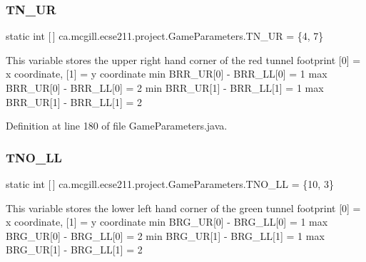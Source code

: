 \subsubsection{\texorpdfstring{T\+N\+\_\+\+UR}{TN\_UR}}
{\footnotesize\ttfamily  static  int \mbox{[}$\,$\mbox{]} ca.\+mcgill.\+ecse211.\+project.\+Game\+Parameters.\+T\+N\+\_\+\+UR = \{4, 7\}\hspace{0.3cm}{\ttfamily [static]}}

This variable stores the upper right hand corner of the red tunnel footprint \mbox{[}0\mbox{]} = x coordinate, \mbox{[}1\mbox{]} = y coordinate min B\+R\+R\+\_\+\+UR\mbox{[}0\mbox{]} -\/ B\+R\+R\+\_\+\+LL\mbox{[}0\mbox{]} = 1 max B\+R\+R\+\_\+\+UR\mbox{[}0\mbox{]} -\/ B\+R\+R\+\_\+\+LL\mbox{[}0\mbox{]} = 2 min B\+R\+R\+\_\+\+UR\mbox{[}1\mbox{]} -\/ B\+R\+R\+\_\+\+LL\mbox{[}1\mbox{]} = 1 max B\+R\+R\+\_\+\+UR\mbox{[}1\mbox{]} -\/ B\+R\+R\+\_\+\+LL\mbox{[}1\mbox{]} = 2 

Definition at line 180 of file Game\+Parameters.\+java.

\mbox{\label{enumca_1_1mcgill_1_1ecse211_1_1project_1_1_game_parameters_a951a1759354ae42a5030e36100f553bc}} 
\subsubsection{\texorpdfstring{T\+N\+O\+\_\+\+LL}{TNO\_LL}}
{\footnotesize\ttfamily  static  int \mbox{[}$\,$\mbox{]} ca.\+mcgill.\+ecse211.\+project.\+Game\+Parameters.\+T\+N\+O\+\_\+\+LL = \{10, 3\}\hspace{0.3cm}{\ttfamily [static]}}

This variable stores the lower left hand corner of the green tunnel footprint \mbox{[}0\mbox{]} = x coordinate, \mbox{[}1\mbox{]} = y coordinate min B\+R\+G\+\_\+\+UR\mbox{[}0\mbox{]} -\/ B\+R\+G\+\_\+\+LL\mbox{[}0\mbox{]} = 1 max B\+R\+G\+\_\+\+UR\mbox{[}0\mbox{]} -\/ B\+R\+G\+\_\+\+LL\mbox{[}0\mbox{]} = 2 min B\+R\+G\+\_\+\+UR\mbox{[}1\mbox{]} -\/ B\+R\+G\+\_\+\+LL\mbox{[}1\mbox{]} = 1 max B\+R\+G\+\_\+\+UR\mbox{[}1\mbox{]} -\/ B\+R\+G\+\_\+\+LL\mbox{[}1\mbox{]} = 2 


